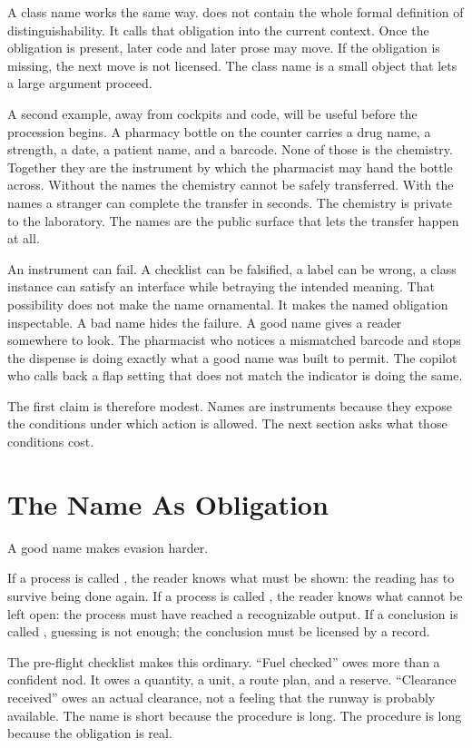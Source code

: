 A class name works the same way.  does not contain the
whole formal definition of distinguishability. It calls that obligation into
the current context. Once the obligation is present, later code and later
prose may move. If the obligation is missing, the next move is not licensed.
The class name is a small object that lets a large argument proceed.

A second example, away from cockpits and code, will be useful before the
procession begins. A pharmacy bottle on the counter carries a drug name, a
strength, a date, a patient name, and a barcode. None of those is the
chemistry. Together they are the instrument by which the pharmacist may hand
the bottle across. Without the names the chemistry cannot be safely
transferred. With the names a stranger can complete the transfer in seconds.
The chemistry is private to the laboratory. The names are the public surface
that lets the transfer happen at all.

An instrument can fail. A checklist can be falsified, a label can be wrong, a
class instance can satisfy an interface while betraying the intended meaning.
That possibility does not make the name ornamental. It makes the named
obligation inspectable. A bad name hides the failure. A good name gives a
reader somewhere to look. The pharmacist who notices a mismatched barcode and
stops the dispense is doing exactly what a good name was built to permit. The
copilot who calls back a flap setting that does not match the indicator is
doing the same.

The first claim is therefore modest. Names are instruments because they expose
the conditions under which action is allowed. The next section asks what those
conditions cost.

\section{The Name As Obligation}
\label{se:the-name-as-obligation}

A good name makes evasion harder.

If a process is called , the reader knows what must be shown:
the reading has to survive being done again. If a process is called
, the reader knows what cannot be left open: the process must
have reached a recognizable output. If a conclusion is called ,
guessing is not enough; the conclusion must be licensed by a record.

The pre-flight checklist makes this ordinary. ``Fuel checked'' owes more than
a confident nod. It owes a quantity, a unit, a route plan, and a reserve.
``Clearance received'' owes an actual clearance, not a feeling that the
runway is probably available. The name is short because the procedure is
long. The procedure is long because the obligation is real.

